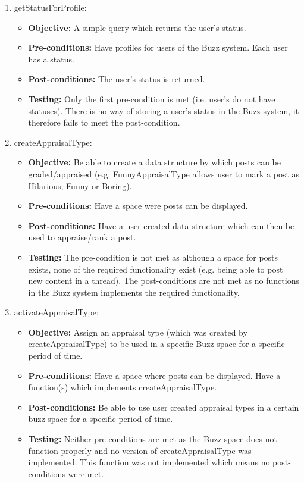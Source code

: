 \begin{enumerate}
\begin{itemize}
	\end{itemize}
\item getStatusForProfile:
	\begin{itemize}
		\item\textbf{Objective: } A simple query which returns the user’s status.
		\item\textbf{Pre-conditions: } Have profiles for users of the Buzz system. Each user has a status.
		\item\textbf{Post-conditions: } The user’s status is returned.
		\item\textbf{Testing: } Only the first pre-condition is met (i.e. user’s do not have statuses). There is no way of storing a user’s status in the Buzz system, it therefore fails to meet the post-condition.
	\end{itemize}
\item createAppraisalType:
	\begin{itemize}
		\item\textbf{Objective: }  Be able to create a data structure by which posts can be graded/appraised (e.g. FunnyAppraisalType allows user to mark a post as Hilarious, Funny or Boring).
		\item\textbf{Pre-conditions: } Have a space were posts can be displayed.
		\item\textbf{Post-conditions: }Have a user created data structure which can then be used to appraise/rank a post.
		\item\textbf{Testing: } The pre-condition is not met as although a space for posts exists, none of the required functionality exist (e.g. being able to post new content in a thread). The post-conditions are not met as no functions in the Buzz system implements the required functionality.
	\end{itemize}
\item activateAppraisalType:
	\begin{itemize}
		\item\textbf{Objective: } Assign an appraisal type (which was created by createAppraisalType) to be used in a specific Buzz space for a specific period of time.
		\item\textbf{Pre-conditions: }  Have a space where posts can be displayed. Have a function(s) which implements createAppraisalType.
		\item\textbf{Post-conditions: }Be able to use user created appraisal types in a certain buzz space for a specific period of time.
		\item\textbf{Testing: }  Neither pre-conditions are met as the Buzz space does not function properly and no version of createAppraisalType was implemented. This function was not implemented which means no post-conditions were met.

\end{itemize}
\end{enumerate}
